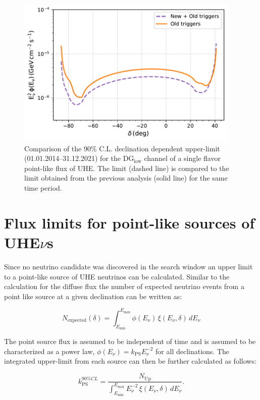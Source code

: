 \begin{figure}[t!]
  \centering
  \includegraphics[width=0.95\textwidth]{thesis_figures/PointLimits/Point_comp_new_old.pdf}
  \caption{Comparison of the 90\% C.L. declination dependent upper-limit (01.01.2014–31.12.2021) for the DG$_{\text{low}}$ channel of a single flavor point-like flux of UHE. The limit (dashed line) is compared to the limit obtained from the previous analysis (solid line) for the same time period.}
  \label{fig:Dec_limit_new old}
\end{figure}

\section{Flux limits for point-like sources of UHE\texorpdfstring{$\nu$s}{}}
\label{sec:pfux_limit}
Since no neutrino candidate was discovered in the search window an upper limit to a  point-like source of UHE neutrinos can be calculated. Similar to the calculation for the diffuse flux the number of expected neutrino events from a point like source at a given declination can be written as:

\begin{equation}
  N_{\text{expected}}(\delta) = \int_{E_{\text{min}}}^{E_{\text{max}}}  \phi(E_{\nu}) \, \xi(E_{\nu}, \delta) \, dE_{\nu}
\end{equation}

The point source flux is assumed to be independent of time and is assumed to be characterized as a power law, $\phi(E_{\nu}) = k_{\text{PS}} E_{\nu}^{-2}$ for all declinations. The integrated upper-limit from each source can then be further calculated as follows:

\begin{equation}
  \label{eq:point_flux_limit}
  k_{\text{PS}}^{90\%CL} = \frac{N_{\text{Up}}}{\int_{E_{\text{min}}}^{E_{\text{max}}} E_{\nu}^{-2} \, \xi(E_{\nu}, \delta) \, dE_{\nu}}.
\end{equation}

